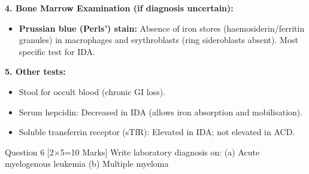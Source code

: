 \documentclass[11pt,a4paper]{article}
\begin{document}
\begin{ansbox}
\textbf{4. Bone Marrow Examination (if diagnosis uncertain):}
\begin{itemize}[leftmargin=*]
    \item \textbf{Prussian blue (Perls') stain:} Absence of iron stores (haemosiderin/ferritin granules) in macrophages and erythroblasts (ring sideroblasts absent). Most specific test for IDA.
\end{itemize}

\textbf{5. Other tests:}
\begin{itemize}[leftmargin=*]
    \item Stool for occult blood (chronic GI loss).
    \item Serum hepcidin: Decreased in IDA (allows iron absorption and mobilisation).
    \item Soluble transferrin receptor (sTfR): Elevated in IDA; not elevated in ACD.
\end{itemize}
\end{ansbox}

\begin{qbox}{Question 6 [2$\times$5=10 Marks]}
Write laboratory diagnosis on: (a) Acute myelogenous leukemia \quad (b) Multiple myeloma
\end{qbox}
\end{document}
